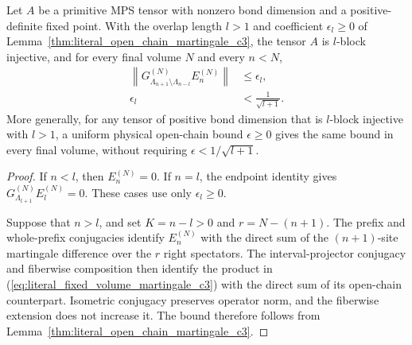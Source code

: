 \begin{lemma}
    \label{thm:literal_fixed_volume_martingale_c3}
    \leanok
    Let $A$ be a primitive MPS tensor with nonzero bond dimension and a
    positive-definite fixed point.  With the overlap length $l>1$ and
    coefficient $\epsilon_l\geq0$ of
    Lemma~\ref{thm:literal_open_chain_martingale_c3}, the tensor $A$ is
    $l$-block injective, and for every final volume $N$ and every $n<N$,
    \begin{align}
        \left\lVert
        G_{\Lambda_{n+1}\setminus\Lambda_{n-l}}^{(N)}E_n^{(N)}
        \right\rVert
         & \leq\epsilon_l,
        \label{eq:literal_fixed_volume_martingale_c3} \\
        \epsilon_l
         & <\frac{1}{\sqrt{l+1}}.
        \label{eq:literal_fixed_volume_martingale_c3_threshold}
    \end{align}
    More generally, for any tensor of positive bond dimension that is
    $l$-block injective with $l>1$, a uniform physical open-chain bound
    $\epsilon\ge0$ gives the same bound in every final volume, without
    requiring $\epsilon<1/\sqrt{l+1}$.
\end{lemma}

\begin{proof}
    \leanok
    If $n<l$, then $E_n^{(N)}=0$.  If $n=l$, the endpoint identity gives
    $G_{\Lambda_{l+1}}^{(N)}E_l^{(N)}=0$.  These cases use only
    $\epsilon_l\geq0$.

    Suppose that $n>l$, and set $K=n-l>0$ and $r=N-(n+1)$.  The prefix and
    whole-prefix conjugacies identify $E_n^{(N)}$ with the direct sum of the
    $(n+1)$-site martingale difference over the $r$ right spectators.  The
    interval-projector conjugacy and fiberwise composition then identify the
    product in
    (\ref{eq:literal_fixed_volume_martingale_c3}) with the direct sum of its
    open-chain counterpart.  Isometric conjugacy preserves operator norm, and
    the fiberwise extension does not increase it.  The bound therefore follows
    from Lemma~\ref{thm:literal_open_chain_martingale_c3}.
\end{proof}

